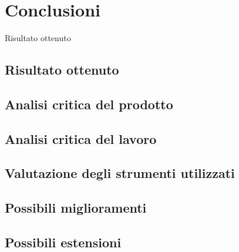 
\chapter{Conclusioni}
\label{cap:conclusioni}
Risultato ottenuto
\section{Risultato ottenuto}
\section{Analisi critica del prodotto}
\section{Analisi critica del lavoro}
\section{Valutazione degli strumenti utilizzati}
\section{Possibili miglioramenti}
\section{Possibili estensioni}